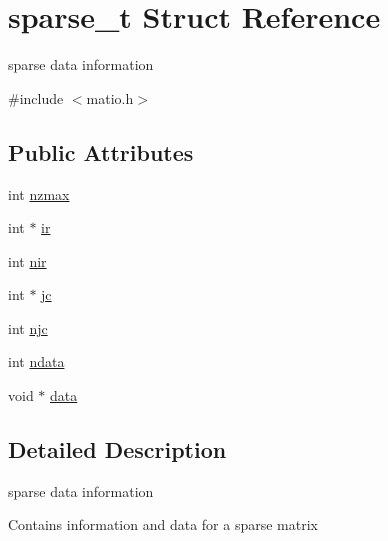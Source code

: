 \hypertarget{structsparse__t}{\section{sparse\-\_\-t \-Struct \-Reference}
\label{structsparse__t}
}


sparse data information  




{\ttfamily \#include $<$matio.\-h$>$}

\subsection*{\-Public \-Attributes}
\begin{DoxyCompactItemize}
\item 
int \hyperlink{structsparse__t_afd116055ad6a18c27b80333fdac45827}{nzmax}
\item 
int $\ast$ \hyperlink{structsparse__t_ae3b4cd31e90bb824e9b00f7c3dec7af4}{ir}
\item 
int \hyperlink{structsparse__t_a6aa1a08cc2760a36771edd65df8cf111}{nir}
\item 
int $\ast$ \hyperlink{structsparse__t_aeea61c5d15e5cc015a8baf55cc130ee1}{jc}
\item 
int \hyperlink{structsparse__t_aa0ef6a0c8be3ad0e3a222371e68f7dd4}{njc}
\item 
int \hyperlink{structsparse__t_ab692009004070fda2da8274767a0788d}{ndata}
\item 
void $\ast$ \hyperlink{structsparse__t_a8194f9468a7d77514db5ed70b54017bb}{data}
\end{DoxyCompactItemize}


\subsection{\-Detailed \-Description}
sparse data information 

\-Contains information and data for a sparse matrix 

